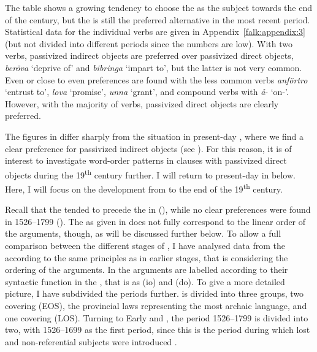 \documentclass[output=paper]{langscibook}
\begin{document}
The table shows a growing tendency to choose the  as the subject towards the end of the century, but the  is still the preferred alternative in the most recent period. Statistical data for the individual verbs are given in Appendix~\ref{falk:appendix:3} (but not divided into different periods since the numbers are low). With two verbs, passivized indirect objects are preferred over passivized direct objects, \textit{beröva} ‘deprive of’ and \textit{bibringa} ‘impart to’, but the latter is not very common. Even or close to even preferences are found with the less common verbs \textit{anförtro} ‘entrust to’, \textit{lova} ‘promise’, \textit{unna} ‘grant’, and compound verbs with \textit{å}{}- ‘on-’. However, with the majority of verbs, passivized direct objects are clearly preferred.\largerpage


The figures in  differ sharply from the situation in present-day , where we find a clear preference for passivized indirect objects (see ). For this reason, it is of interest to investigate word-order patterns in clauses with passivized direct objects during the 19\textsuperscript{th} century further. I will return to present-day  in  below. Here, I will focus on the development from  to the end of the 19\textsuperscript{th} century.



Recall that the  tended to precede the  in  (), while no clear preferences were found in 1526–1799 (). The  as given in  does not fully correspond to the linear order of the arguments, though, as will be discussed further below. To allow a full comparison between the different stages of , I have analysed data from the  according to the same principles as in earlier stages, that is considering the ordering of the arguments. In  the arguments are labelled according to their syntactic function in the , that is as  (io) and  (do). To give a more detailed picture, I have subdivided the periods further.  is divided into three groups, two covering  (EOS), the provincial laws representing the most archaic language, and one covering  (LOS). Turning to Early and , the period 1526–1799 is divided into two, with 1526–1699 as the first period, since this is the period during which  lost  and non-referential subjects were introduced \citep{Falk1993}.
\end{document}
